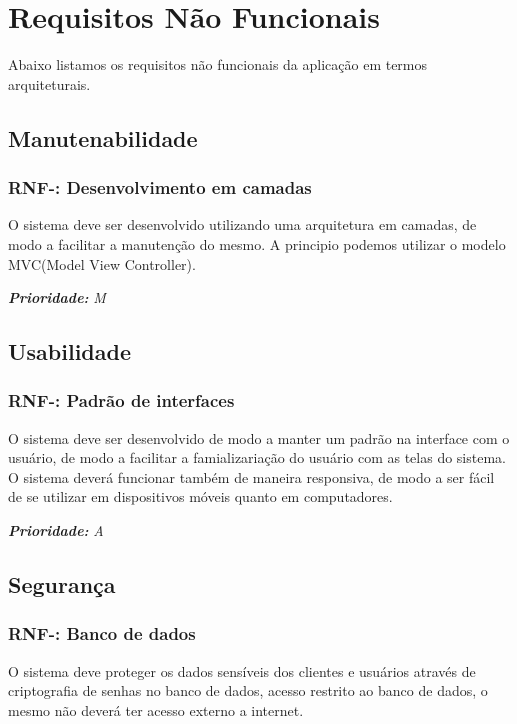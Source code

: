 \pgfmathsetmacro{}
\chapter{Requisitos Não Funcionais}
Abaixo listamos os requisitos não funcionais da aplicação em termos arquiteturais\cite{Sommerville:2011}.

\section{Manutenabilidade}
\vspace{0.5cm}
\pgfmathtruncatemacro{}
\subsection{RNF-\nreqnf: Desenvolvimento em camadas}
O sistema deve ser desenvolvido utilizando uma arquitetura em camadas, de modo a facilitar a manutenção do mesmo. A principio
podemos utilizar o modelo MVC(Model View Controller).

\vspace{0.5cm}
\noindent\textbf{\textit{Prioridade:}} \textit{M}

\vspace{0.5cm}
\section{Usabilidade}
\pgfmathtruncatemacro{}
\subsection{RNF-\nreqnf: Padrão de interfaces}
O sistema deve ser desenvolvido de modo a manter um padrão na interface com o usuário, de modo a facilitar 
a famializariação do usuário com as telas do sistema. O sistema deverá funcionar também de 
maneira responsiva, de modo a ser fácil de se utilizar em dispositivos móveis quanto em computadores.  

\vspace{0.5cm}
\noindent\textbf{\textit{Prioridade:}} \textit{A}
\vspace{0.5cm}
\section{Segurança}
\pgfmathtruncatemacro{}
\subsection{RNF-\nreqnf: Banco de dados}
O sistema deve proteger os dados sensíveis dos clientes e usuários através de criptografia de senhas no banco de dados,
acesso restrito ao banco de dados, o mesmo não deverá ter acesso externo a internet. 

